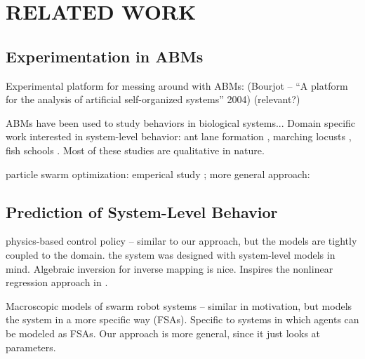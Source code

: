 \chapter{RELATED WORK}
\thispagestyle{plain}

\label{RelatedWork}


\section{Experimentation in ABMs}
Experimental platform for messing around with ABMs: (Bourjot -- ``A platform for the analysis of artificial self-organized systems'' 2004) (relevant?)

ABMs have been used to study behaviors in biological systems... Domain specific work interested in system-level behavior: ant lane formation \cite{couzin2003sol}, marching locusts \cite{buhl2006dom}, fish schools \cite{parrish2002sof}. Most of these studies are qualitative in nature.

particle swarm optimization: emperical study \cite{shi1998parameter}; more general approach: \cite{van2006study}

\section{Prediction of System-Level Behavior}

physics-based control policy \cite{spears2004dpb} -- similar to our approach, but the models are tightly coupled to the domain. the system was designed with system-level models in mind. Algebraic inversion for inverse mapping is nice. Inspires the nonlinear regression approach in \fw.

Macroscopic models of swarm robot systems \cite{lerman2002mmf}\cite{lerman2005rpm} -- similar in motivation, but models the system in a more specific way (FSAs). Specific to systems in which agents can be modeled as FSAs. Our approach is more general, since it just looks at parameters.



